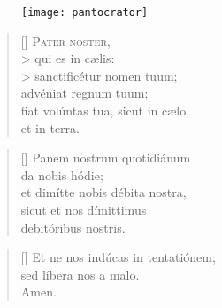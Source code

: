 \documentclass[omni.tex]{subfiles}
\begin{document}
\begin{figure}
{\begin{center}
    \texttt{[image: pantocrator]}
\end{center}}
\end{figure}

\settowidth{\versewidth}{Et ne nos ind\'ucas in tentati\'onem}

\begin{verse}[\versewidth]
\lettrine[lhang=1.0,nindent=0em]{P}{ater noster}, \\>
qui es in c\ae lis: \\>
sanctific\'etur nomen tuum; \\
adv\'eniat regnum tuum; \\
fiat vol\'untas tua, sicut in c\ae lo, \\
et in terra.
\end{verse}

\begin{verse}[\versewidth]
Panem nostrum quotidi\'anum \\
da nobis h\'odie; \\
et dim\'itte nobis d\'ebita nostra, \\
sicut et nos d\'imittimus \\
debit\'oribus nostris.
\end{verse}

\begin{verse}[\versewidth]
Et ne nos ind\'ucas in tentati\'onem; \\
sed l\'ibera nos a malo. \\
Amen. \\[0\baselineskip]
\end{verse}

\pagebreak
\end{document}

